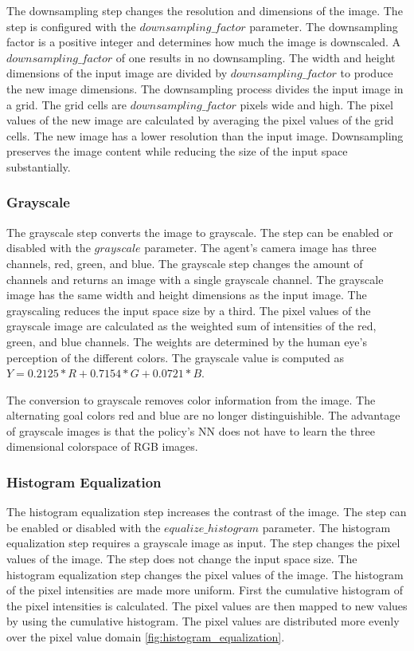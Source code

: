 The downsampling step changes the resolution and dimensions of the image. The step is configured with the $downsampling\_factor$ parameter. The downsampling factor is a positive integer and determines how much the image is downscaled. A $downsampling\_factor$ of one results in no downsampling. The width and height dimensions of the input image are divided by $downsampling\_factor$ to produce the new image dimensions.
The downsampling process divides the input image in a grid. The grid cells are $downsampling\_factor$ pixels wide and high. The pixel values of the new image are calculated by averaging the pixel values of the grid cells. The new image has a lower resolution than the input image.
Downsampling preserves the image content while reducing the size of the input space substantially.


\subsubsection{Grayscale}

The grayscale step converts the image to grayscale. The step can be enabled or disabled with the $grayscale$ parameter. The agent's camera image has three channels, red, green, and blue. The grayscale step changes the amount of channels and returns an image with a single grayscale channel. The grayscale image has the same width and height dimensions as the input image. The grayscaling reduces the input space size by a third.
The pixel values of the grayscale image are calculated as the weighted sum of intensities of the red, green, and blue channels. The weights are determined by the human eye's perception of the different colors. The grayscale value is computed as $Y = 0.2125 * R + 0.7154 * G + 0.0721 * B$.

The conversion to grayscale removes color information from the image. The alternating goal colors red and blue are no longer distinguishible. The advantage of grayscale images is that the policy's \ac{NN} does not have to learn the three dimensional colorspace of RGB images.



\subsubsection{Histogram Equalization}
\label{sec:histogram_equalization}

The histogram equalization step increases the contrast of the image. The step can be enabled or disabled with the $equalize\_histogram$ parameter. The histogram equalization step requires a grayscale image as input. The step changes the pixel values of the image. The step does not change the input space size.
The histogram equalization step changes the pixel values of the image. The histogram of the pixel intensities are made more uniform. First the cumulative histogram of the pixel intensities is calculated. The pixel values are then mapped to new values by using the cumulative histogram. The pixel values are distributed more evenly over the pixel value domain \ref{fig:histogram_equalization}.

